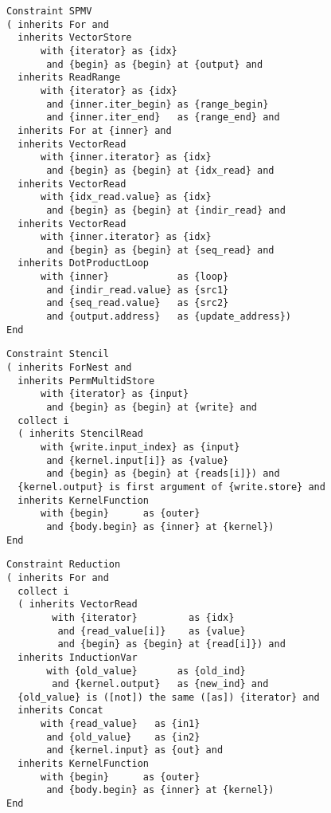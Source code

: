 \begin{figure}[p]
\begin{lstlisting}[language=IDL,
                   label={fig:spmv},caption={IDL specification of SPMV}]
Constraint SPMV
( inherits For and
  inherits VectorStore
      with {iterator} as {idx}
       and {begin} as {begin} at {output} and
  inherits ReadRange
      with {iterator} as {idx} 
       and {inner.iter_begin} as {range_begin} 
       and {inner.iter_end}   as {range_end} and
  inherits For at {inner} and
  inherits VectorRead
      with {inner.iterator} as {idx}
       and {begin} as {begin} at {idx_read} and
  inherits VectorRead
      with {idx_read.value} as {idx}
       and {begin} as {begin} at {indir_read} and
  inherits VectorRead
      with {inner.iterator} as {idx}
       and {begin} as {begin} at {seq_read} and
  inherits DotProductLoop
      with {inner}            as {loop}
       and {indir_read.value} as {src1}
       and {seq_read.value}   as {src2}
       and {output.address}   as {update_address})
End
\end{lstlisting}
\end{figure}

\begin{figure}[p]
\begin{lstlisting}[language=IDL,
                   label={fig:stencilcompute},caption={IDL specification of simple stencil}]
Constraint Stencil
( inherits ForNest and
  inherits PermMultidStore
      with {iterator} as {input} 
       and {begin} as {begin} at {write} and
  collect i
  ( inherits StencilRead
      with {write.input_index} as {input}
       and {kernel.input[i]} as {value}
       and {begin} as {begin} at {reads[i]}) and
  {kernel.output} is first argument of {write.store} and
  inherits KernelFunction
      with {begin}      as {outer}
       and {body.begin} as {inner} at {kernel})
End
\end{lstlisting}
\end{figure}

\begin{figure}[p]
\begin{lstlisting}[language=IDL,
                   label={fig:scalarreduction},caption=
   {IDL specification of scalar reductions}]
Constraint Reduction
( inherits For and
  collect i
  ( inherits VectorRead
        with {iterator}         as {idx}
         and {read_value[i]}    as {value}
         and {begin} as {begin} at {read[i]}) and
  inherits InductionVar
       with {old_value}       as {old_ind}
        and {kernel.output}   as {new_ind} and
  {old_value} is ([not]) the same ([as]) {iterator} and
  inherits Concat
      with {read_value}   as {in1}
       and {old_value}    as {in2}
       and {kernel.input} as {out} and
  inherits KernelFunction
      with {begin}      as {outer}
       and {body.begin} as {inner} at {kernel})
End
\end{lstlisting}
\end{figure}